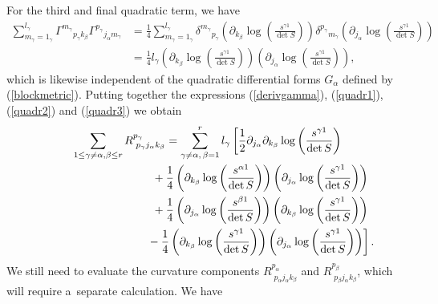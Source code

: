\documentclass[pdftex]{sigma}
\numberwithin{equation}{section}
\newcommand{\jalpha}{j_{\alpha}}
\newcommand{\kbeta}{k_{\beta}}
\newcommand{\pgamma}{p_{\gamma}}
\newcommand{\mgamma}{m_{\gamma}}
\newcommand{\palpha}{p_{\alpha}}
\newcommand{\pbeta}{p_{\beta}}
\newcommand{\lgamma}{l_{\gamma}}
\begin{document}
For the third and final quadratic term, we have
\begin{align}
\sum_{\mgamma=1_{\gamma}}^{\lgamma}{\Gamma^{\mgamma}}_{\pgamma \kbeta}{\Gamma^{\pgamma}}_{\jalpha \mgamma} &=\frac{1}{4}\sum_{\mgamma=1_{\gamma}}^{\lgamma}{\delta^{\mgamma}}_{\pgamma}\left(\partial_{\kbeta}\log\left(\frac{s^{\gamma 1}}{\det S}\right)\right){\delta^{\pgamma}}_{\mgamma}\left(\partial_{\jalpha}\log\left(\frac{s^{\gamma 1}}{\det S}\right)\right)\nonumber\\
&=\frac{1}{4}\lgamma \left(\partial_{\kbeta}\log\left(\frac{s^{\gamma 1}}{\det S}\right)\right)\left(\partial_{\jalpha}\log\left(\frac{s^{\gamma 1}}{\det S}\right)\right),\label{quadr3}
\end{align}
which is likewise independent of the quadratic differential forms $G_{\alpha}$ defined by (\ref{blockmetric}). Putting together the expressions (\ref{derivgamma}), (\ref{quadr1}), (\ref{quadr2}) and (\ref{quadr3}) we obtain
\begin{gather}
\sum_{1\leq \gamma \neq \alpha, \beta\leq r}R^{\pgamma}_{{\phantom l} \pgamma \jalpha \kbeta}=\sum_{\gamma \neq \alpha, \,\beta =1}^{r}l_{\gamma}\left[\frac{1}{2}\partial_{\jalpha}\partial_{\kbeta}\log\left(\frac{s^{\gamma 1}}{\det S}\right)\right.\nonumber\\
\hphantom{\sum_{1\leq \gamma \neq \alpha, \beta\leq r}R^{\pgamma}_{{\phantom l} \pgamma \jalpha \kbeta}=}{}
+\frac{1}{4}\left(\partial_{\kbeta}\log\left(\frac{s^{\alpha 1}}{\det S}\right)\right)\left(\partial_{\jalpha}\log\left(\frac{s^{\gamma 1}}{\det S}\right)\right)\nonumber\\
\hphantom{\sum_{1\leq \gamma \neq \alpha, \beta\leq r}R^{\pgamma}_{{\phantom l} \pgamma \jalpha \kbeta}=}{}
+ \frac{1}{4}\left(\partial_{\jalpha}\log\left(\frac{s^{\beta 1}}{\det S}\right)\right)\left(\partial_{\kbeta}\log\left(\frac{s^{\gamma 1}}{\det S}\right)\right)\nonumber\\
\left.\hphantom{\sum_{1\leq \gamma \neq \alpha, \beta\leq r}R^{\pgamma}_{{\phantom l} \pgamma \jalpha \kbeta}=}{}
-\frac{1}{4}\left(\partial_{\kbeta}\log\left(\frac{s^{\gamma 1}}{\det S}\right)\right)\left(\partial_{\jalpha}\log\left(\frac{s^{\gamma 1}}{\det S}\right)\right)\right].\label{Riccidecomp1}
\end{gather}
We still need to evaluate the curvature components $R^{\palpha}_{{\phantom l} \palpha \jalpha \kbeta}$ and $R^{\pbeta}_{{\phantom l} \pbeta \jalpha \kbeta}$, which will require a~separate calculation. We have
\end{document}
